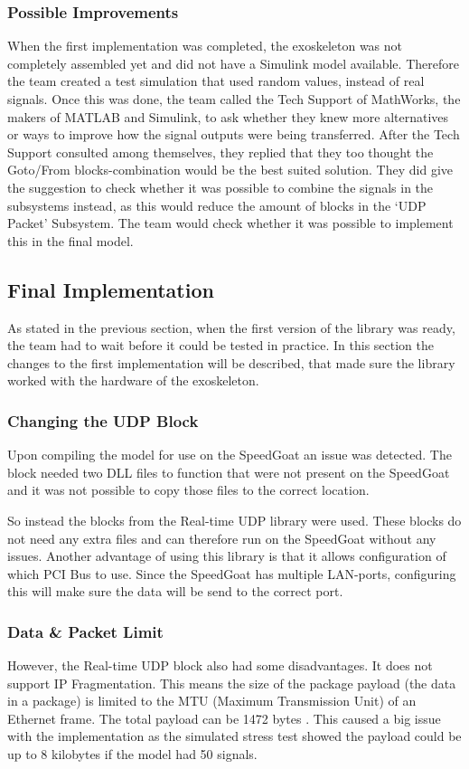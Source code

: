 \subsubsection{Possible Improvements}
When the first implementation was completed, the exoskeleton was not completely assembled yet and did not have a Simulink model available. Therefore the team created a test simulation that used random values, instead of real signals. Once this was done, the team called the Tech Support of MathWorks, the makers of MATLAB and Simulink, to ask whether they knew more alternatives or ways to improve how the signal outputs were being transferred. After the Tech Support consulted among themselves, they replied that they too thought the Goto/From blocks-combination would be the best suited solution. They did give the suggestion to check whether it was possible to combine the signals in the subsystems instead, as this would reduce the amount of blocks in the `UDP Packet' Subsystem. The team would check whether it was possible to implement this in the final model.

\subsection{Final Implementation}\label{sec:simfinim}
As stated in the previous section, when the first version of the library was ready, the team had to wait before it could be tested in practice. In this section the changes to the first implementation will be described, that made sure the library worked with the hardware of the exoskeleton.

\subsubsection{Changing the UDP Block}
Upon compiling the model for use on the SpeedGoat an issue was detected. The block needed two DLL files to function that were not present on the SpeedGoat and it was not possible to copy those files to the correct location.

So instead the blocks from the Real-time UDP library were used. These blocks do not need any extra files and can therefore run on the SpeedGoat without any issues. Another advantage of using this library is that it allows configuration of which PCI Bus to use. Since the SpeedGoat has multiple LAN-ports, configuring this will make sure the data will be send to the correct port.

\subsubsection{Data \& Packet Limit}
However, the Real-time UDP block also had some disadvantages. It does not support IP Fragmentation. This means the size of the package payload (the data in a package) is limited to the MTU (Maximum Transmission Unit) of an Ethernet frame. The total payload can be 1472 bytes \cite{web:RealTimeUdp}. This caused a big issue with the implementation as the simulated stress test showed the payload could be up to 8 kilobytes if the model had 50 signals.

